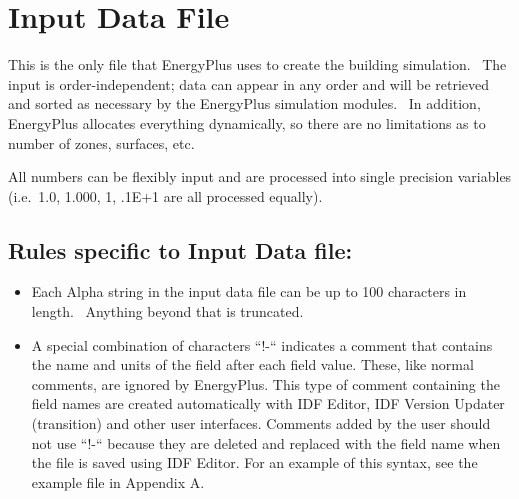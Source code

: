 \section{Input Data File}\label{input-data-file}

This is the only file that EnergyPlus uses to create the building simulation.~ The input is order-independent; data can appear in any order and will be retrieved and sorted as necessary by the EnergyPlus simulation modules.~ In addition, EnergyPlus allocates everything dynamically, so there are no limitations as to number of zones, surfaces, etc.

All numbers can be flexibly input and are processed into single precision variables (i.e.~1.0, 1.000, 1, .1E+1 are all processed equally).

\subsection{Rules specific to Input Data file:}\label{rules-specific-to-input-data-file}

\begin{itemize}
\item
  Each Alpha string in the input data file can be up to 100 characters in length.~ Anything beyond that is truncated.
\item
  A special combination of characters ``!-`` indicates a comment that contains the name and units of the field after each field value. These, like normal comments, are ignored by EnergyPlus. This type of comment containing the field names are created automatically with IDF Editor, IDF Version Updater (transition) and other user interfaces. Comments added by the user should not use ``!-`` because they are deleted and replaced with the field name when the file is saved using IDF Editor. For an example of this syntax, see the example file in Appendix A.
\end{itemize}
